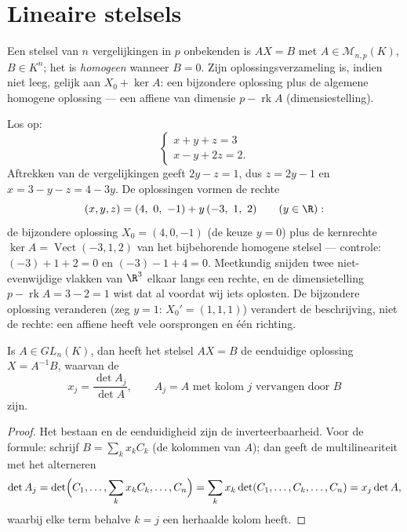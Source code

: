 \section{Lineaire stelsels}

\begin{definition}\label{def:b1:det:system}
Een  stelsel van $n$ vergelijkingen in
$p$ onbekenden is $AX = B$ met $A \in \mathcal{M}_{n,p}(K)$, $B \in
K^n$; het is \emph{homogeen} wanneer $B = 0$. Zijn
oplossingsverzameling is, indien niet leeg, gelijk aan $X_0 + \ker
A$: een bijzondere oplossing plus de algemene homogene oplossing ---
een affiene  van dimensie $p - \operatorname{rk} A$
(dimensiestelling).
\end{definition}

\begin{example}
\label{ex:b1:det:affinestructure}
Los op:
\[
\begin{cases}
x + y + z = 3\\
x - y + 2z = 2 .
\end{cases}
\]
Aftrekken van de vergelijkingen geeft $2y - z = 1$, dus $z = 2y -
1$ en $x = 3 - y - z = 4 - 3y$. De oplossingen vormen de rechte
\[
(x, y, z) = (4,\ 0,\ -1) + y\,(-3,\ 1,\ 2)
\qquad (y \in \R):
\]
de bijzondere oplossing $X_0 = (4, 0, -1)$ (de keuze $y = 0$) plus
de kernrechte $\ker A = \operatorname{Vect}(-3, 1, 2)$ van het
bijbehorende homogene stelsel --- controle: $(-3) + 1 + 2 = 0$ en
$(-3) - 1 + 4 = 0$. Meetkundig snijden twee niet-evenwijdige
vlakken van $\R^3$ elkaar langs een rechte, en de dimensietelling
$p - \operatorname{rk} A = 3 - 2 = 1$ wist dat al voordat wij iets
oplosten. De bijzondere oplossing veranderen (zeg $y = 1$: $X_0' =
(1, 1, 1)$) verandert de beschrijving, niet de rechte: een affiene
 heeft vele oorsprongen en één richting.
\end{example}

\begin{theorem}\label{thm:b1:det:cramer}
Is $A \in GL_n(K)$, dan heeft het stelsel $AX = B$ de eenduidige
oplossing $X = A^{-1}B$, waarvan de 
\[
x_j = \frac{\det A_j}{\det A},
\qquad A_j = A \text{ met kolom } j \text{ vervangen door } B
\]
zijn.
\end{theorem}

\begin{proof}
Het bestaan en de eenduidigheid zijn de inverteerbaarheid. Voor de
formule: schrijf $B = \sum_k x_k C_k$ (de kolommen van $A$); dan
geeft de multilineariteit met het alterneren
\[
\det A_j = \det\Bigl(C_1, \dots, \sum_k x_k C_k, \dots, C_n\Bigr)
= \sum_k x_k \det(C_1, \dots, C_k, \dots, C_n)
= x_j \det A ,
\]
waarbij elke term behalve $k = j$ een herhaalde kolom heeft.
\end{proof}

